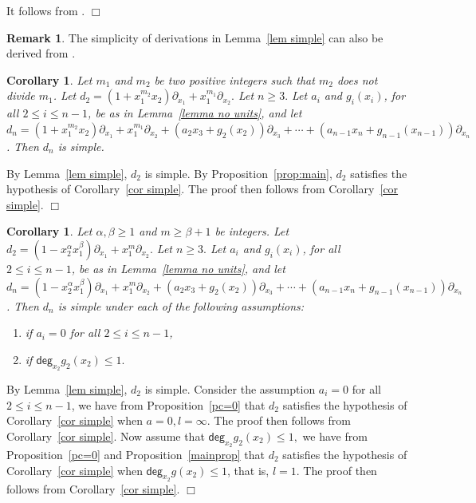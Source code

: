 \documentclass[12pt,reqno]{amsart}
\renewcommand{\deg}{\mathsf{deg}}
\renewcommand{\leq}{\leqslant}
\renewcommand{\geq}{\geqslant}
\numberwithin{thm}{section}
\newtheorem{cor}[thm]{Corollary}
\theoremstyle{definition}
\newtheorem{rem}[thm]{Remark}
\numberwithin{equation}{thm}
\renewenvironment{proof}{\par\noindent {\em Proof:}}{\hfill$\Box$\medskip}
\theoremstyle{plain}
\begin{document}
\begin{proof}
    It follows from \cite[Theorem 2.6]{SP25}. 
\end{proof}
\begin{rem}
The simplicity of derivations in Lemma~\ref{lem simple} can also be derived from \cite[Theorem 4.1 and Theorem 6.1]{Kour14}.
\end{rem}
\begin{cor}
     Let $m_1$ and $m_2$ be two positive integers such that $m_2$ does not divide $m_1$. Let $d_2=(1 +x_1^{m_2}x_2)\partial_{x_1}+x_1^{m_1}\partial_{x_2}.$ Let $n\geq 3.$ Let $a_i$ and $g_i(x_i)$, for all $2\leq i\leq n-1$, be as in Lemma~\ref{lemma no units}, and let $d_n=(1 +x_1^{m_2}x_2)\partial_{x_1}+x_1^{m_1}\partial_{x_2}+(a_2 x_3 +g_2(x_2))\partial_{x_3}+\cdots+(a_{n-1}x_n + g_{n-1}(x_{n-1}))\partial_{x_n}$. Then $d_n$ is simple.
\end{cor}
\begin{proof}
    By Lemma~\ref{lem simple}, $d_2$ is simple. By Proposition~\ref{prop:main}, $d_2$ satisfies the hypothesis of Corollary~\ref{cor simple}. The proof then follows from Corollary~\ref{cor simple}. 
\end{proof}
\begin{cor}
     Let $\alpha,\beta\geq 1$ and $m\geq \beta+1$ be integers. Let $d_2=(1-x_2^{\alpha} x_1^{\beta})\partial_{x_1} +x_1^m\partial_{x_2}.$ Let $n\geq 3.$ Let $a_i$ and $g_i(x_i)$, for all $2\leq i\leq n-1$, be as in Lemma~\ref{lemma no units}, and let $d_n=(1-x_2^{\alpha} x_1^{\beta})\partial_{x_1} +x_1^m\partial_{x_2}+(a_2 x_3 +g_2(x_2))\partial_{x_3}+\cdots+(a_{n-1}x_n + g_{n-1}(x_{n-1}))\partial_{x_n}$. Then $d_n$ is simple under each of the following assumptions:
     \begin{enumerate}
         \item[(i)] if $a_i=0$ for all $2\leq i \leq n-1$,
         \item[(ii)] if $\deg_{x_2}g_2(x_2)\leq 1.$
     \end{enumerate}
    
\end{cor}
\begin{proof}
     By Lemma~\ref{lem simple}, $d_2$ is simple. Consider the assumption $a_i=0$ for all $2\leq i \leq n-1$, we have from Proposition~\ref{pc=0} that $d_2$ satisfies the hypothesis of Corollary~\ref{cor simple} when $a=0, l=\infty$. The proof then follows from Corollary~\ref{cor simple}. Now assume that $\deg_{x_2}g_2(x_2)\leq 1,$ we have from Proposition~\ref{pc=0} and Proposition~\ref{mainprop} that $d_2$ satisfies the hypothesis of Corollary~\ref{cor simple} when $\deg_{x_2}g(x_2)\leq 1$, that is, $l=1$. The proof then follows from Corollary~\ref{cor simple}. 
\end{proof}
\end{document}

